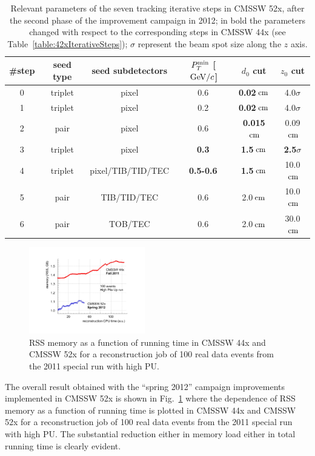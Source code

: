 \begin{description}
\begin{table}[t]
  \centering
  \begin{tabular}{cccccc}
  \#step & seed type & seed subdetectors & $P^{\rm min}_T$ [${\rm \, GeV}/c$] &
  $d_0$ cut & $z_0$ cut \\ \hline  
  0 & triplet & pixel & 0.6 & {\bf 0.02}$\rm \, cm$ & 4.0$\sigma$ \\
  1 & triplet & pixel & 0.2 & {\bf 0.02}$\rm \, cm$ & 4.0$\sigma$ \\
  2 & pair    & pixel & 0.6 & {\bf 0.015}$\rm \, cm$ & 0.09$\rm \, cm$ \\
  3 & triplet & pixel & {\bf 0.3} & {\bf 1.5}$\rm \, cm$ & {\bf 2.5}$\sigma$ \\
  4 & triplet & pixel/TIB/TID/TEC & {\bf 0.5-0.6} & {\bf 1.5}$\rm \, cm$ & 10.0$\rm \, cm$ \\
  5 & pair    & TIB/TID/TEC       & 0.6 & 2.0$\rm \, cm$ & 10.0$\rm \, cm$ \\
  6 & pair    & TOB/TEC           & 0.6       & 2.0$\rm \, cm$ & 30.0$\rm \, cm$ \\
\end{tabular}
  \caption{Relevant parameters of the seven tracking iterative steps in
    CMSSW 52x, after the second phase of the improvement campaign in
    2012; in bold the parameters changed with respect to the 
    corresponding steps in CMSSW 44x (see
    Table~\ref{table:42xIterativeSteps}); $\sigma$ represent the beam spot size
    along the $z$ axis.}
  \label{table:52xIterativeSteps}
\end{table}
\end{description}
\begin{figure}[t]
\begin{center}
\includegraphics*[width=0.45\textwidth]{figs/spring12.pdf}
\caption{RSS memory as a
function of running time in CMSSW 44x and CMSSW 52x for a
reconstruction job of 100 real data events from the 2011 special
run with high PU.}
\label{fig:spring12}
\end{center}
\end{figure}

The overall result obtained with the ``spring 2012'' campaign
improvements implemented in CMSSW 52x is shown in
Fig.~\ref{fig:spring12} where the dependence of RSS memory as a
function of running time is plotted in CMSSW 44x and CMSSW 52x for a
reconstruction job of 100 real data events from the 2011 special
run with high PU. The substantial reduction either in memory load
either in total running time is clearly evident.






